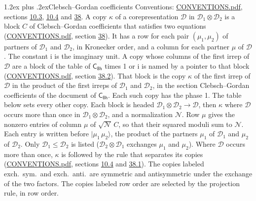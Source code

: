 \documentclass[10pt,a4paper]{article}
\makeatletter
\renewcommand\section{\@startsection{section}{1}{\z@}{-3ex plus -1ex minus -.2ex}%
  {1.2ex plus .2ex}{\normalfont\large\sffamily\bfseries\color{parttitle}}}
\numberwithin{equation}{section}
\newcommand{\grp}[1]{\mathsf{#1}}
\newcommand{\iunit}{\mathrm{i}}
\newcommand{\irrprod}{\otimes}
\newcommand{\mult}{\kappa}
\newcommand{\intx}{\mu}
\newcommand{\cgnorm}{\mathcal{N}}
\newcommand{\prodket}[2]{\lvert {#1}\,{#2}\rangle}
\makeatother
\begin{document}
\section{Clebsch--Gordan coefficients}\label{s:clebsch_gordan}
Conventions: \href{../../CONVENTIONS.pdf}{CONVENTIONS.pdf}, sections \href{../../../rotation/CONVENTIONS.pdf\#conv.10.3}{10.3}, \href{../../../rotation/CONVENTIONS.pdf\#conv.10.4}{10.4} and \href{../../CONVENTIONS.pdf\#conv.38}{38}.
\leavevmode\label{n:index.copy}\label{n:matrix.cg.stored}A copy $\mult$ of a corepresentation $\mathcal{D}$ in $\mathcal{D}_1\irrprod\mathcal{D}_2$ is a block $C$ of Clebsch--Gordan coefficients that satisfies two equations (\href{../../CONVENTIONS.pdf}{CONVENTIONS.pdf}, section \href{../../CONVENTIONS.pdf\#conv.38}{38}). \label{n:index.cg}It has a row for each pair $(\intx_1, \intx_2)$ of partners of $\mathcal{D}_1$ and $\mathcal{D}_2$, in Kronecker order, and a column for each partner $\intx$ of $\mathcal{D}$.
The constant $\iunit$ is the imaginary unit.
A copy whose columns of the first irrep of $\mathcal{D}$ are a block of the table of $\grp{C_{8h}}$ times 1 or $\iunit$ is named by a pointer to that block (\href{../../CONVENTIONS.pdf}{CONVENTIONS.pdf}, section \href{../../CONVENTIONS.pdf\#conv.38.2}{38.2}). That block is the copy $\mult$ of the first irrep of $\mathcal{D}$ in the product of the first irreps of $\mathcal{D}_1$ and $\mathcal{D}_2$, in the section Clebsch--Gordan coefficients of the document of \href{../../../rotation/data/pdf/C8h.pdf}{$\grp{C_{8h}}$}. Each such copy has the phase 1. The table below sets every other copy.
Each block is headed $\mathcal{D}_1\irrprod\mathcal{D}_2\to\mathcal{D}$, then $\mult$ where $\mathcal{D}$ occurs more than once in $\mathcal{D}_1\irrprod\mathcal{D}_2$, and a normalization $\cgnorm$. Row $\intx$ gives the nonzero entries of column $\intx$ of $\sqrt{\cgnorm}\,C$, so that their squared moduli sum to $\cgnorm$. \label{n:vector.ket.product}Each entry is written before $\prodket{\intx_1}{\intx_2}$, the product of the partners $\intx_1$ of $\mathcal{D}_1$ and $\intx_2$ of $\mathcal{D}_2$. Only $\mathcal{D}_1 \le \mathcal{D}_2$ is listed ($\mathcal{D}_2\irrprod\mathcal{D}_1$ exchanges $\intx_1$ and $\intx_2$).
Where $\mathcal{D}$ occurs more than once, $\mult$ is followed by the rule that separates its copies (\href{../../CONVENTIONS.pdf}{CONVENTIONS.pdf}, sections \href{../../../rotation/CONVENTIONS.pdf\#conv.10.4}{10.4} and \href{../../CONVENTIONS.pdf\#conv.38.1}{38.1}). \label{n:abbreviation.exchange}The copies labeled exch.\ sym.\ and exch.\ anti.\ are symmetric and antisymmetric under the exchange of the two factors. The copies labeled row order are selected by the projection rule, in row order.
\end{document}
